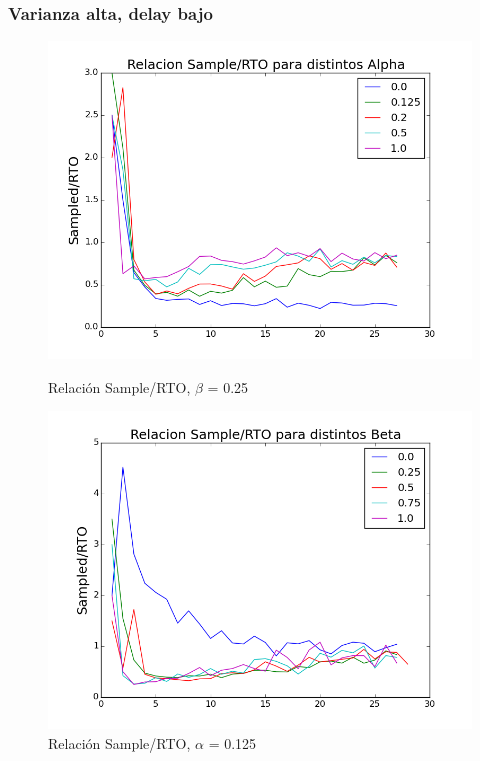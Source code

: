 \subsubsection{Varianza alta, delay bajo}

\begin{figure}[H]
\begin{minipage}{0.5\linewidth}
\includegraphics[width=\linewidth]{../graficos/alphad01var5drop0.png}
\caption{Relación Sample/RTO, $\beta$ = 0.25}\label{fig:alpha-var5-drop0}
\end{minipage}
\hfill
\begin{minipage}{0.5\linewidth}
\includegraphics[width=\linewidth]{../graficos/betad01var5drop0.png}
\caption{Relación Sample/RTO, $\alpha$ = 0.125}\label{fig:beta-var5-drop0}
\end{minipage}
\end{figure}

